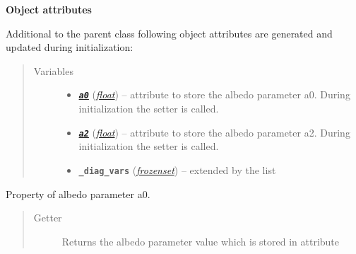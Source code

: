 \documentclass[letterpaper,10pt,english]{sphinxmanual}
\begin{document}
\begin{fulllineitems}
\begin{quote}
\begin{description}
\end{description}\end{quote}

\textbf{Object attributes}

Additional to the parent class 
{\hyperref[api/climlab.process:climlab.process.diagnostic.DiagnosticProcess]{\emph{}}}
following object attributes are generated and updated during initialization:
\begin{quote}\begin{description}
\item[{Variables}] \leavevmode\begin{itemize}
\item {} 
{\hyperref[api/climlab.surface:climlab.surface.albedo.P2Albedo.a0]{\emph{\textbf{\texttt{a0}}}}} (\href{http://docs.python.org/2.7/library/functions.html\#float}{\emph{float}}) -- attribute to store the albedo parameter a0. 
During initialization the 
{\hyperref[api/climlab.surface:climlab.surface.albedo.P2Albedo.a0]{\emph{}}} setter is called.

\item {} 
{\hyperref[api/climlab.surface:climlab.surface.albedo.P2Albedo.a2]{\emph{\textbf{\texttt{a2}}}}} (\href{http://docs.python.org/2.7/library/functions.html\#float}{\emph{float}}) -- attribute to store the albedo parameter a2. 
During initialization the 
{\hyperref[api/climlab.surface:climlab.surface.albedo.P2Albedo.a2]{\emph{}}} setter is called.

\item {} 
\textbf{\texttt{\_diag\_vars}} (\href{http://docs.python.org/2.7/library/stdtypes.html\#frozenset}{\emph{frozenset}}) -- extended by the list \code{{[}'albedo',{]}}

\end{itemize}

\end{description}\end{quote}

\begin{fulllineitems}
\label{api/climlab.surface:climlab.surface.albedo.P2Albedo.a0}
Property of albedo parameter a0.
\begin{quote}\begin{description}
\item[{Getter}] \leavevmode
Returns the albedo parameter value which is stored in attribute 


\end{description}
\end{quote}
\end{fulllineitems}
\end{fulllineitems}
\end{document}
